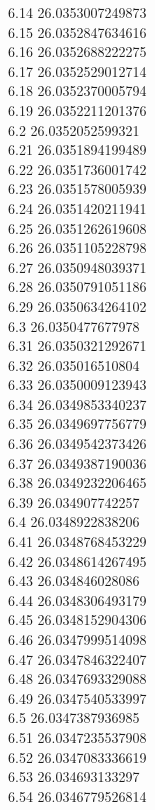 {6.14	26.0353007249873\\
6.15	26.0352847634616\\
6.16	26.0352688222275\\
6.17	26.0352529012714\\
6.18	26.0352370005794\\
6.19	26.0352211201376\\
6.2	26.0352052599321\\
6.21	26.0351894199489\\
6.22	26.0351736001742\\
6.23	26.0351578005939\\
6.24	26.0351420211941\\
6.25	26.0351262619608\\
6.26	26.0351105228798\\
6.27	26.0350948039371\\
6.28	26.0350791051186\\
6.29	26.0350634264102\\
6.3	26.0350477677978\\
6.31	26.0350321292671\\
6.32	26.035016510804\\
6.33	26.0350009123943\\
6.34	26.0349853340237\\
6.35	26.0349697756779\\
6.36	26.0349542373426\\
6.37	26.0349387190036\\
6.38	26.0349232206465\\
6.39	26.034907742257\\
6.4	26.0348922838206\\
6.41	26.0348768453229\\
6.42	26.0348614267495\\
6.43	26.034846028086\\
6.44	26.0348306493179\\
6.45	26.0348152904306\\
6.46	26.0347999514098\\
6.47	26.0347846322407\\
6.48	26.0347693329088\\
6.49	26.0347540533997\\
6.5	26.0347387936985\\
6.51	26.0347235537908\\
6.52	26.0347083336619\\
6.53	26.034693133297\\
6.54	26.0346779526814\\
}
